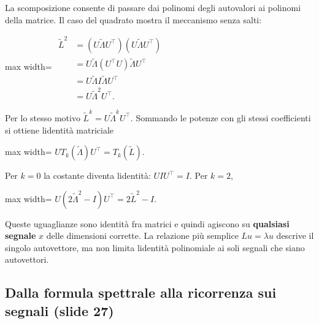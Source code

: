 \documentclass[11pt,a4paper,oneside,openany]{book}
\begin{document}
La scomposizione consente di passare dai polinomi degli autovalori ai polinomi della matrice. Il caso del quadrato mostra il meccanismo senza salti:

\begin{center}
\begin{adjustbox}{max width=\linewidth}
$\displaystyle \begin{aligned}
\widetilde L^2
&=(U\widetilde\Lambda U^\top)(U\widetilde\Lambda U^\top)\\
&=U\widetilde\Lambda(U^\top U)\widetilde\Lambda U^\top\\
&=U\widetilde\Lambda I\widetilde\Lambda U^\top\\
&=U\widetilde\Lambda^2U^\top.
\end{aligned}$
\end{adjustbox}
\end{center}

Per lo stesso motivo \(\widetilde L^k=U\widetilde\Lambda^kU^\top\). Sommando le potenze con gli stessi coefficienti si ottiene l\textquotesingle identità matriciale

\begin{center}
\begin{adjustbox}{max width=\linewidth}
$\displaystyle \boxed{UT_k(\widetilde\Lambda)U^\top=T_k(\widetilde L).}$
\end{adjustbox}
\end{center}

Per \(k=0\) la costante diventa l\textquotesingle identità: \(UIU^\top=I\). Per \(k=2\),

\begin{center}
\begin{adjustbox}{max width=\linewidth}
$\displaystyle U(2\widetilde\Lambda^2-I)U^\top=2\widetilde L^2-I.$
\end{adjustbox}
\end{center}

Queste uguaglianze sono identità fra matrici e quindi agiscono su \textbf{qualsiasi segnale} \(x\) delle dimensioni corrette. La relazione più semplice \(Lu=\lambda u\) descrive il singolo autovettore, ma non limita l\textquotesingle identità polinomiale ai soli segnali che siano autovettori.

\subsection{Dalla formula spettrale alla ricorrenza sui segnali (slide 27)}\label{f05-r467}
\end{document}
